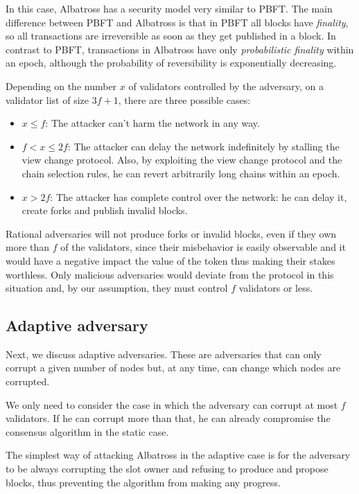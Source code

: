 \documentclass[conference]{IEEEtran}
\begin{document}
In this case, Albatross has a security model very similar to PBFT. The main difference between PBFT and Albatross is that in PBFT all blocks have \textit{finality}, so all transactions are irreversible as soon as they get published in a block. In contrast to PBFT, transactions in Albatross have only \textit{probabilistic finality} within an epoch, although the probability of reversibility is exponentially decreasing.

Depending on the number $x$ of validators controlled by the adversary, on a validator list of size $3f+1$, there are three possible cases:

\begin{itemize}
	\item $x \leq f$: The attacker can't harm the network in any way.
	\item $f < x \leq 2f$: The attacker can delay the network indefinitely by stalling the view change protocol. Also, by exploiting the view change protocol and the chain selection rules, he can revert arbitrarily long chains within an epoch.
	\item $x > 2f$: The attacker has complete control over the network: he can delay it, create forks and publish invalid blocks.
\end{itemize}

Rational adversaries will not produce forks or invalid blocks, even if they own more than $f$ of the validators, since their misbehavior is easily observable and it would have a negative impact the value of the token thus making their stakes worthless. Only malicious adversaries would deviate from the protocol in this situation and, by our assumption, they must control $f$ validators or less.

\subsection{Adaptive adversary}
Next, we discuss adaptive adversaries. These are adversaries that can only corrupt a given number of nodes but, at any time, can change which nodes are corrupted.

We only need to consider the case in which the adversary can corrupt at most $f$ validators. If he can corrupt more than that, he can already compromise the consensus algorithm in the static case.

The simplest way of attacking Albatross in the adaptive case is for the adversary to be always corrupting the slot owner and refusing to produce and propose blocks, thus preventing the algorithm from making any progress.
\end{document}
